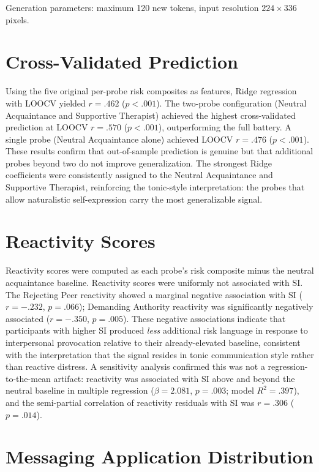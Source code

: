 \documentclass[review,12pt,authoryear]{elsarticle}
\begin{document}
Generation parameters: maximum 120 new tokens, input resolution $224 \times 336$ pixels.

\section{Cross-Validated Prediction}\label{app:cv_prediction}

Using the five original per-probe risk composites as features, Ridge regression with LOOCV yielded $r = .462$ ($p < .001$). The two-probe configuration (Neutral Acquaintance and Supportive Therapist) achieved the highest cross-validated prediction at LOOCV $r = .570$ ($p < .001$), outperforming the full battery. A single probe (Neutral Acquaintance alone) achieved LOOCV $r = .476$ ($p < .001$). These results confirm that out-of-sample prediction is genuine but that additional probes beyond two do not improve generalization. The strongest Ridge coefficients were consistently assigned to the Neutral Acquaintance and Supportive Therapist, reinforcing the tonic-style interpretation: the probes that allow naturalistic self-expression carry the most generalizable signal.

\section{Reactivity Scores}\label{app:reactivity}

Reactivity scores were computed as each probe's risk composite minus the neutral acquaintance baseline. Reactivity scores were uniformly not associated with SI. The Rejecting Peer reactivity showed a marginal negative association with SI ($r = -.232$, $p = .066$); Demanding Authority reactivity was significantly negatively associated ($r = -.350$, $p = .005$). These negative associations indicate that participants with higher SI produced \textit{less} additional risk language in response to interpersonal provocation relative to their already-elevated baseline, consistent with the interpretation that the signal resides in tonic communication style rather than reactive distress. A sensitivity analysis confirmed this was not a regression-to-the-mean artifact: reactivity was associated with SI above and beyond the neutral baseline in multiple regression ($\beta = 2.081$, $p = .003$; model $R^2 = .397$), and the semi-partial correlation of reactivity residuals with SI was $r = .306$ ($p = .014$).

\section{Messaging Application Distribution}\label{app:apps}
\end{document}
